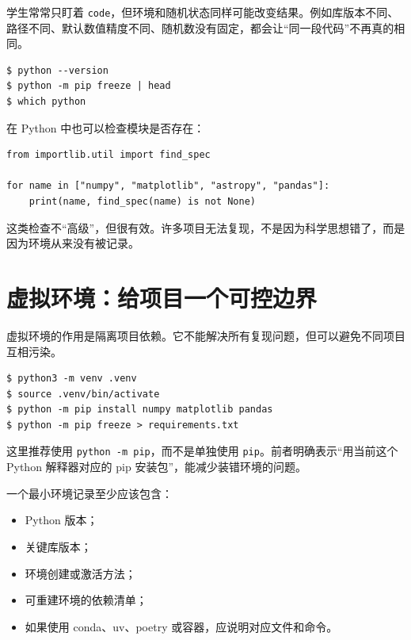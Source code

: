 学生常常只盯着 \texttt{code}，但环境和随机状态同样可能改变结果。例如库版本不同、路径不同、默认数值精度不同、随机数没有固定，都会让“同一段代码”不再真的相同。

\begin{examplebox}[检查关键环境信息]
\begin{lstlisting}[style=terminal]
$ python --version
$ python -m pip freeze | head
$ which python
\end{lstlisting}
\end{examplebox}

在 Python 中也可以检查模块是否存在：

\begin{examplebox}[检查模块可用性]
\begin{lstlisting}[style=pythonstyle]
from importlib.util import find_spec

for name in ["numpy", "matplotlib", "astropy", "pandas"]:
    print(name, find_spec(name) is not None)
\end{lstlisting}
\end{examplebox}

这类检查不“高级”，但很有效。许多项目无法复现，不是因为科学思想错了，而是因为环境从来没有被记录。

\section{虚拟环境：给项目一个可控边界}

虚拟环境的作用是隔离项目依赖。它不能解决所有复现问题，但可以避免不同项目互相污染。

\begin{examplebox}
\begin{lstlisting}[style=terminal]
$ python3 -m venv .venv
$ source .venv/bin/activate
$ python -m pip install numpy matplotlib pandas
$ python -m pip freeze > requirements.txt
\end{lstlisting}
\end{examplebox}

这里推荐使用 \texttt{python -m pip}，而不是单独使用 \texttt{pip}。前者明确表示“用当前这个 Python 解释器对应的 pip 安装包”，能减少装错环境的问题。

一个最小环境记录至少应该包含：

\begin{itemize}
    \item Python 版本；
    \item 关键库版本；
    \item 环境创建或激活方法；
    \item 可重建环境的依赖清单；
    \item 如果使用 conda、uv、poetry 或容器，应说明对应文件和命令。
\end{itemize}

